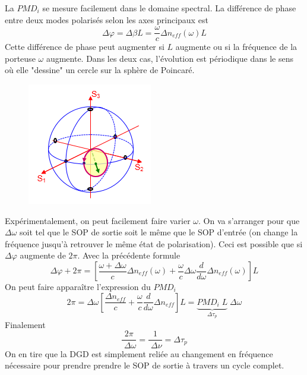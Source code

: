 La $PMD_i$ se mesure facilement dans le domaine spectral. La différence de phase entre deux modes
polarisés selon les axes principaux est
\begin{equation}
\Delta \varphi  = \Delta \beta L = \frac{\omega }{c}\Delta {n_{eff}}(\omega )L
\end{equation}
Cette différence de phase peut augmenter si $L$ augmente ou si la fréquence de la porteuse $\omega$
augmente. Dans les deux cas, l'évolution est périodique dans le sens où elle "dessine" un cercle
sur la sphère de Poincaré.

\newpage

	\begin{figure}
	\includegraphics[scale=0.5]{ch1/image50}
	\end{figure}
Expérimentalement, on peut facilement faire varier $\omega$. On va s'arranger pour que $\Delta \omega$
soit tel que le SOP de sortie soit le même que le SOP d'entrée (on change la fréquence jusqu'à 
retrouver le même état de polarisation). Ceci est possible que si $\Delta\varphi$ augmente de $2\pi$. 
Avec la précédente formule
\begin{equation}
\Delta \varphi  + 2\pi  = [\frac{{\omega  + \Delta \omega }}{c}\Delta {n_{eff}}(\omega ) + \frac{\omega }{c}\Delta \omega \frac{d}{{d\omega }}\Delta {n_{eff}}(\omega )]L
\end{equation}
On peut faire apparaître l'expression du $PMD_i$
\begin{equation}
2\pi  = \Delta \omega [\frac{{\Delta {n_{eff}}}}{c} + \frac{\omega }{c}\frac{d}{{d\omega }}\Delta {n_{eff}}]L = \underbrace{PM{D_i}\;L}_{\Delta\tau_p}\;\Delta \omega 
\end{equation}
Finalement
\begin{equation}
\frac{{2\pi }}{{\;\Delta \omega }} = \frac{1}{{\;\Delta \nu }} = \Delta {\tau _p}
\end{equation}
On en tire que la DGD est simplement reliée au changement en fréquence nécessaire pour prendre
prendre le SOP de sortie à travers un cycle complet.\\





